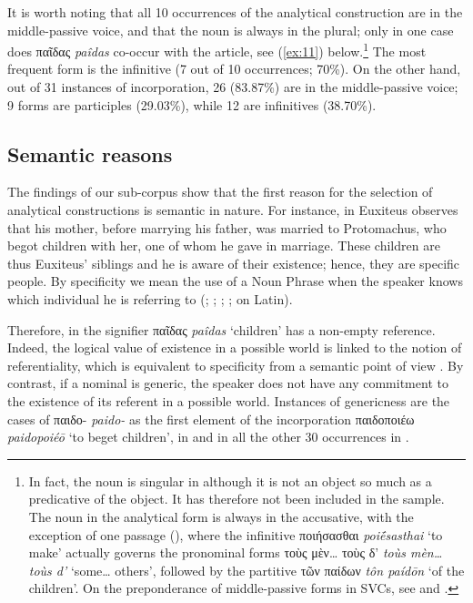 \documentclass[output=paper,colorlinks,citecolor=brown]{langscibook}
\begin{document}
It is worth noting that all 10 occurrences of the analytical construction are in the middle-passive voice, and that the noun is always in the plural; only in one case does παῖδας \textit{paîdas} co-occur with the article, see (\ref{ex:11}) below.\footnote{In fact, the noun is singular in  although it is not an object so much as a predicative of the object. It has therefore not been included in the sample. The noun in the analytical form is always in the accusative, with the exception of one passage (), where the infinitive ποιήσασθαι \textit{poiḗsasthai} `to make' actually governs the pronominal forms τοὺς μὲν\ldots{} τοὺς δ' \textit{toùs mèn\ldots{} toùs d'} `some\ldots{} others', followed by the partitive τῶν παίδων \textit{tôn paídōn} `of the children'. On the preponderance of middle-passive forms in SVCs, see \citet{Marini2010} and \citet{Jimenez2011}.} The most frequent form is the infinitive (7 out of 10 occurrences; 70\%). On the other hand, out of 31 instances of incorporation, 26 (83.87\%) are in the middle-passive voice; 9 forms are participles (29.03\%), while 12 are infinitives (38.70\%).

\subsection{Semantic reasons}\label{Section2/2}
The findings of our sub-corpus show that the first reason for the selection of analytical constructions is semantic in nature. For instance, in  Euxiteus observes that his mother, before marrying his father, was married to Protomachus, who begot children with her, one of whom he gave in marriage. These children are thus Euxiteus' siblings and he is aware of their existence; hence, they are specific people. By specificity we mean the use of a Noun Phrase when the speaker knows which individual he is referring to (\citealt{Hawkins1978}; \citealt[259--261]{Lehmann1984}; \citealt[10]{vonHeusinger2002}; \citealt[45]{vonHeusinger2003}; \citealt[335--336]{Vester1989} on Latin). 


Therefore, in  the signifier παῖδας \textit{paîdas} `children' has a non-empty reference. Indeed, the logical value of existence in a possible world is linked to the notion of referentiality, which is equivalent to specificity from a semantic point of view \citep[293]{Givon1978}. By contrast, if a nominal is generic, the speaker does not have any commitment to the existence of its referent in a possible world. Instances of genericness are the cases of παιδο- \textit{paido-} as the first element of the incorporation παιδοποιέω \textit{paidopoiéō} `to beget children', in  and in all the other 30 occurrences in . 
\end{document}
